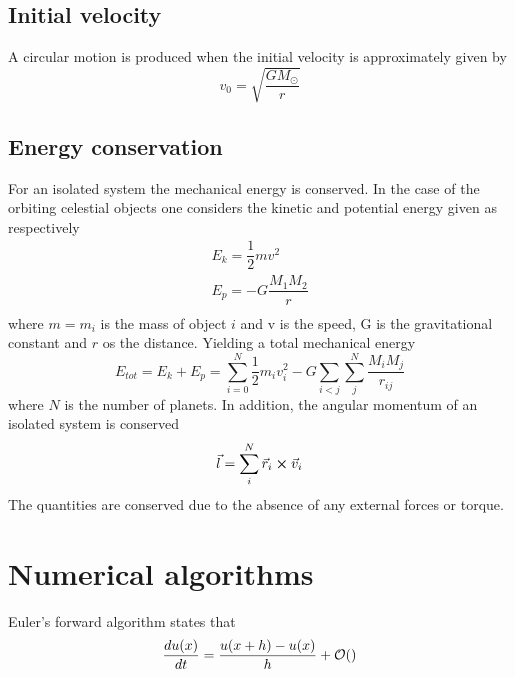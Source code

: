 \documentclass[%
reprint,nofootinbib,
amsmath,amssymb,
aps,
]{revtex4-1}
\begin{document}
\subsection{Initial velocity}
A circular motion is produced when the initial velocity is approximately given by 
\begin{equation}\label{v0}
	v_0 = \sqrt{\dfrac{GM_\odot}{r}}
\end{equation}


\subsection{Energy conservation}
For an isolated system the mechanical energy is conserved. In the case of the orbiting celestial objects one considers the kinetic and potential energy given as respectively 
\begin{align}
	E_k = \dfrac{1}{2}mv^2 \\ 
	E_p = -G\dfrac{M_1M_2}{r} \\
\end{align}
where $m=m_i$ is the mass of object $i$ and v is the speed, G is the gravitational constant and $r$ os the distance. Yielding a total mechanical energy 
\begin{equation}
	E_{tot} = E_k + E_p =  \sum_{i = 0}^{N} \dfrac{1}{2}m_iv_i^2 - G \sum_{i<j}\sum_{j}^{N} \dfrac{M_iM_j}{r_{ij}}
\end{equation}
where $N$ is the number of planets. In addition, the angular momentum of an isolated system is conserved 
\begin{equation}
	\vec{l} = \sum_{i}^{N}\vec{r}_i\cross \vec{v}_i
\end{equation}
The quantities are conserved due to the absence of any external forces or torque. 

\section{Numerical algorithms}
Euler's forward algorithm states that
\begin{equation}
	\dfrac{du(x)}{dt} = \dfrac{u(x+h)-u(x)}{h} + \order{}
\end{equation}
\end{document}
